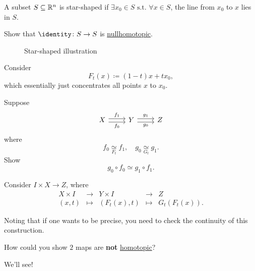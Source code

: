 \begin{exercise}
	A subset \(S\subseteq \mathbb{\MakeUppercase{R}} ^n\) is star-shaped if \(\exists x_0\in S \text{ s.t. }\forall x\in S\),
	the line from \(x_0\) to \(x\) lies in \(S\).

	Show that \(\identity\colon S\to S\) is \hyperref[def:nullhomotopic]{nullhomotopic}.

	\begin{figure}[H]
		\centering
		\caption{Star-shaped illustration}
		\label{fig:eg:star-shaped}
	\end{figure}
\end{exercise}
\begin{answer}
	Consider
	\[
		F_{t}(x) \coloneqq (1 - t)x+tx_0,
	\]
	which essentially just concentrates all points \(x\) to \(x_0\).
\end{answer}
\begin{exercise}
	Suppose
	\[
		\begin{tikzcd}
			X & Y & Z
			\arrow["{f_0}"', shift right=1, from=1-1, to=1-2]
			\arrow["{g_0}"', shift right=1, from=1-2, to=1-3]
			\arrow["{f_1}", shift left=1, from=1-1, to=1-2]
			\arrow["{g_1}", shift left=1, from=1-2, to=1-3]
		\end{tikzcd}
	\]
	where
	\[
		f_0 \underset{F_{t}}{\simeq} f_1,\quad g_0\underset{G_{t}}{\simeq} g_1.
	\]
	Show
	\[
		g_0\circ f_0\simeq g_{1}\circ f_1.
	\]
\end{exercise}
\begin{answer}
	Consider \(I\times X\to Z\), where
	\[
		\begin{array}{ccccc}
			X \times I & \to     & Y \times I  & \to     & Z                \\
			(x, t)     & \mapsto & (F_t(x), t) & \mapsto & G_{t}(F_{t}(x)).
		\end{array}
	\]
	\begin{remark}
		Noting that if one wants to be precise, you need to check the continuity of this construction.
	\end{remark}
\end{answer}

\begin{exercise}
	How could you show \(2\) maps are \textbf{not} \hyperref[def:homotopic]{homotopic}?
\end{exercise}
\begin{answer}
	We'll see!
\end{answer}